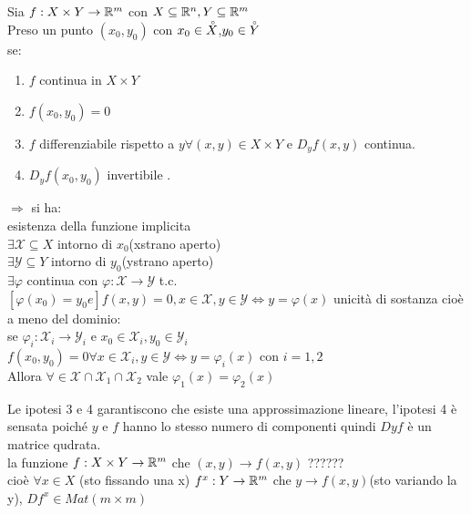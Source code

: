 \begin{theorem}
	\label{teo:funz_impl}
	Sia $f:X\times Y\rightarrow \mathbb{R}^m$ con $X\subseteq \mathbb{R}^n, Y\subseteq \mathbb{R}^m$\\
	Preso un punto $(x_0,y_0)$ con $x_0\in \accentset{\circ}{X}$,$y_0\in \accentset{\circ}{Y}$\\
	se:
	\begin{enumerate}
		\item $f$ continua in $X\times Y$
		\item $f(x_0,y_0)=0$
		\item $f$ differenziabile rispetto a $y \forall (x,y)\in X\times Y$ e $D_yf(x,y)$ continua.
		\item $D_yf(x_0,y_0)$ invertibile .
	\end{enumerate}
	$\Rightarrow $ si ha:\\
	esistenza della funzione implicita\\
	$\exists \mathcal{X}\subseteq X$ intorno di $x_0$(xstrano aperto)\\
	$\exists \mathcal{Y}\subseteq Y$ intorno di $y_0$(ystrano aperto)\\
	$\exists\varphi$ continua con $\varphi:\mathcal{X}\rightarrow\mathcal{Y}$ t.c. $[\varphi (x_0)=y_0 e] f(x,y)=0, x\in\mathcal{X},y\in\mathcal{Y} \iff y=\varphi(x)$
	unicità di sostanza cioè a meno del dominio:\\
	se $\varphi_i:\mathcal{X}_i\rightarrow\mathcal{Y}_i$ e $x_0\in\mathcal{X}_i,y_0\in\mathcal{Y}_i$\\
	$f(x_0,y_0)=0 \forall x\in\mathcal{X}_i, y\in \mathcal{Y}\iff y=\varphi_i(x)$ con $i=1,2$\\
	Allora $\forall\in\mathcal{X}\cap\mathcal{X}_1\cap\mathcal{X}_2$ vale $\varphi_1(x)=\varphi_2(x)$

	\observation
	Le ipotesi 3 e 4 garantiscono che esiste una approssimazione lineare, l'ipotesi 4 è sensata poiché $y$ e $f$ hanno lo stesso numero di componenti quindi $Dyf$ è un matrice qudrata.\\
	la funzione $f:X\times Y\rightarrow \mathbb{R}^m$ che $(x,y)\rightarrow f(x,y)$ ??????\\
	cioè $\forall x\in X$ (sto fissando una x) $f^x:Y\rightarrow \mathbb{R}^m$ che $y\rightarrow f(x,y)$(sto variando la y), $Df^x\in Mat(m\times m)$


\end{theorem}
